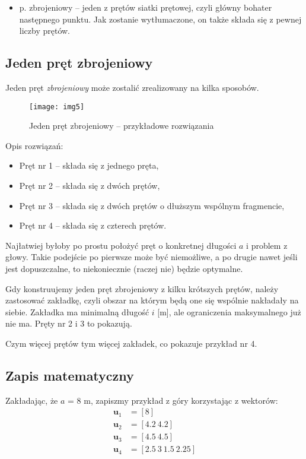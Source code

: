 \documentclass[11pt]{article}
\begin{document}
{\begin{itemize}[--]
\item p. zbrojeniowy -- jeden z prętów siatki prętowej, czyli główny bohater następnego punktu. Jak zostanie wytłumaczone, on także składa się z pewnej liczby prętów.
\end{itemize}

\newpage

\subsection{Jeden pręt zbrojeniowy}

Jeden pręt \emph{zbrojeniowy} może zostalić zrealizowany na kilka sposobów.
\begin{figure}[h!]
	\centering
	\texttt{[image: img5]}
	\caption{Jeden pręt zbrojeniowy -- przykładowe rozwiązania}
\end{figure}

Opis rozwiązań:
\begin{itemize}[--]
\item Pręt nr 1 -- składa się z jednego pręta,
\item Pręt nr 2 -- składa się z dwóch prętów,
\item Pręt nr 3 -- składa się z dwóch prętów o dłuższym wspólnym fragmencie,
\item Pręt nr 4 -- składa się z czterech prętów.
\end{itemize}

Najłatwiej byłoby po prostu położyć pręt o konkretnej długości $a$ i problem z głowy. Takie podejście po pierwsze może być niemożliwe, a po drugie nawet jeśli jest dopuszczalne, to niekoniecznie (raczej nie) będzie optymalne.

Gdy konstruujemy jeden pręt zbrojeniowy z kilku krótszych prętów, należy zastosować zakładkę, czyli obszar na którym będą one się wspólnie nakładały na siebie. Zakładka ma minimalną długość $i$ [m], ale ograniczenia maksymalnego już nie ma. Pręty nr 2 i 3 to pokazują.

Czym więcej prętów tym więcej zakładek, co pokazuje przykład nr 4.

\subsection{Zapis matematyczny}

Zakładając, że $a$ = 8 m, zapiszmy przykład z góry korzystając z wektorów:
\begin{align*}
\mathbf{u}_1 &= \left[ 8 \right] \\
\mathbf{u}_2 &= \left[ 4.2 \ 4.2 \right] \\
\mathbf{u}_3 &= \left[ 4.5 \ 4.5 \right] \\
\mathbf{u}_4 &= \left[ 2.5 \ 3 \ 1.5 \ 2.25 \right]
\end{align*}

}
\end{document}
